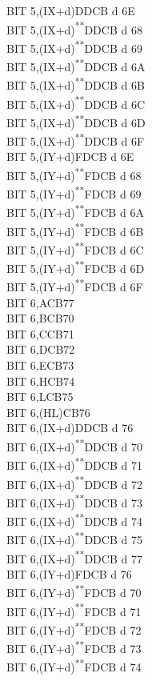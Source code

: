 \documentclass[12pt,twoside,openright,a4paper]{book}
\newcommand{\UNDOC}{\textnormal{\textsuperscript{**}}}
\begin{document}
\begin{multicols}{3}
{\begin{tabbing}
		BIT 5,(IX+d)\>DDCB d 6E\\
		BIT 5,(IX+d)\UNDOC\>DDCB d 68\\
		BIT 5,(IX+d)\UNDOC\>DDCB d 69\\
		BIT 5,(IX+d)\UNDOC\>DDCB d 6A\\
		BIT 5,(IX+d)\UNDOC\>DDCB d 6B\\
		BIT 5,(IX+d)\UNDOC\>DDCB d 6C\\
		BIT 5,(IX+d)\UNDOC\>DDCB d 6D\\
		BIT 5,(IX+d)\UNDOC\>DDCB d 6F\\
		BIT 5,(IY+d)\>FDCB d 6E\\
		BIT 5,(IY+d)\UNDOC\>FDCB d 68\\
		BIT 5,(IY+d)\UNDOC\>FDCB d 69\\
		BIT 5,(IY+d)\UNDOC\>FDCB d 6A\\
		BIT 5,(IY+d)\UNDOC\>FDCB d 6B\\
		BIT 5,(IY+d)\UNDOC\>FDCB d 6C\\
		BIT 5,(IY+d)\UNDOC\>FDCB d 6D\\
		BIT 5,(IY+d)\UNDOC\>FDCB d 6F\\
		BIT 6,A\>CB77\\
		BIT 6,B\>CB70\\
		BIT 6,C\>CB71\\
		BIT 6,D\>CB72\\
		BIT 6,E\>CB73\\
		BIT 6,H\>CB74\\
		BIT 6,L\>CB75\\
		BIT 6,(HL)\>CB76\\
		BIT 6,(IX+d)\>DDCB d 76\\
		BIT 6,(IX+d)\UNDOC\>DDCB d 70\\
		BIT 6,(IX+d)\UNDOC\>DDCB d 71\\
		BIT 6,(IX+d)\UNDOC\>DDCB d 72\\
		BIT 6,(IX+d)\UNDOC\>DDCB d 73\\
		BIT 6,(IX+d)\UNDOC\>DDCB d 74\\
		BIT 6,(IX+d)\UNDOC\>DDCB d 75\\
		BIT 6,(IX+d)\UNDOC\>DDCB d 77\\
		BIT 6,(IY+d)\>FDCB d 76\\
		BIT 6,(IY+d)\UNDOC\>FDCB d 70\\
		BIT 6,(IY+d)\UNDOC\>FDCB d 71\\
		BIT 6,(IY+d)\UNDOC\>FDCB d 72\\
		BIT 6,(IY+d)\UNDOC\>FDCB d 73\\
		BIT 6,(IY+d)\UNDOC\>FDCB d 74\\

\end{tabbing}}
\end{multicols}
\end{document}
